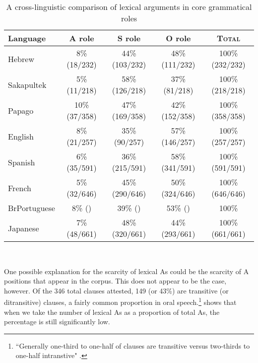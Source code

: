\begin{table}[H]
\begin{center}
\caption{\small{A cross-linguistic comparison of lexical arguments in core grammatical roles}} 
\begin{tabular}{| l | c | c | c | c |}\hline
Language & A role & S role & O role & \textsc{Total} \\
\hline
 Hebrew & 8{\%} (18/232) & 44{\%}(103/232) & 48{\%} (111/232) & 100{\%} (232/232) \\
  \hline
 Sakapultek & 5{\%} (11/218) & 58{\%} (126/218)  & 37{\%} (81/218) &  100{\%} (218/218)  \\
\hline
Papago & 10{\%} (37/358) & 47{\%} (169/358)  & 42{\%} (152/358)  &  100{\%} (358/358) \\
\hline
English & 8{\%} (21/257) & 35{\%} (90/257)  & 57{\%} (146/257)  &  100{\%} (257/257) \\
\hline
Spanish & 6{\%} (35/591) & 36{\%} (215/591)  & 58{\%} (341/591)  &  100{\%} (591/591) \\
\hline
French & 5{\%} (32/646) & 45{\%} (290/646)  & 50{\%} (324/646)  &  100{\%} (646/646)  \\
\hline
BrPortuguese & 8{\%} () & 39{\%} ()  & 53{\%} ()  &  100{\%}  \\
\hline
Japanese & 7{\%} (48/661) & 48{\%} (320/661)  & 44{\%} (293/661)  &  100{\%} (661/661) \\
\hline
\end{tabular}\\
\label{crossgeneraldist}
\end{center}
\end{table}


One possible explanation for the scarcity of lexical As could be the scarcity of A positions that appear in the corpus. This does not appear to be the case, however. Of the 346 total clauses attested, 149 (or 43{\%}) are transitive (or ditransitive) clauses, a fairly common proportion in oral speech.\footnote{``Generally one-third to one-half of clauses are transitive versus two-thirds to one-half intranstive"  \citep[63-64]{dubois2003a}.}  shows that when we take the number of lexical As as a proportion of total As, the percentage is still significantly low.


